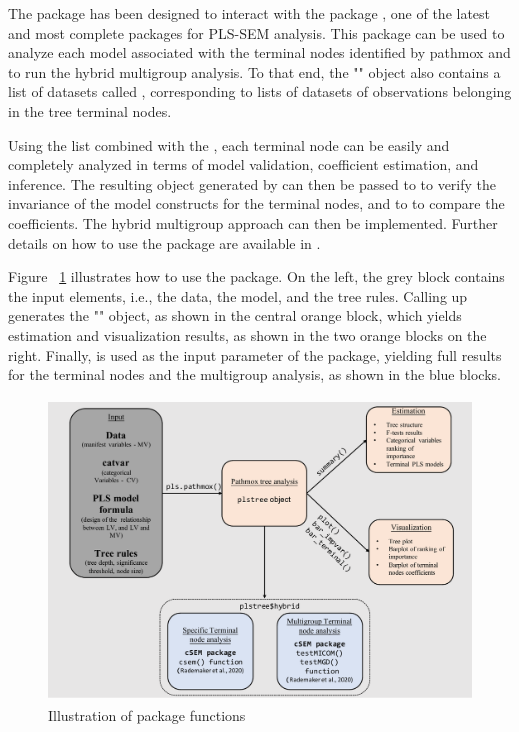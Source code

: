 The  package has been designed to interact with the  package \citep{csem}, one of the latest and  most complete packages for PLS-SEM analysis. This package can be used to analyze each model associated with the terminal nodes identified by pathmox and to run the hybrid multigroup analysis. To that end, the  "" object also contains a list of datasets called , corresponding to lists of datasets of observations belonging in the tree terminal nodes. 

Using the  list combined with the , each terminal node can be easily and completely analyzed  in terms of model validation, coefficient estimation, and inference. The resulting object generated by  can then be passed to   to verify the invariance of the model constructs for the terminal nodes, and to   to compare the coefficients. The hybrid multigroup approach \citep{Lamberti21} can then be implemented. Further details on how to use the  package are available in \citet{csem}. 

Figure ~\ref{figure:flow} illustrates how to use the  package. On the left, the grey block contains the input elements, i.e., the data, the model, and the tree rules. Calling up  generates the  "" object, as shown in the central orange block, which yields estimation and visualization results, as shown in the two orange blocks on the right. Finally,   is used as the input parameter of the  package, yielding full results for the terminal nodes and the multigroup analysis, as shown in the blue  blocks. 

\begin{figure}[htbp]
  \centering
  \includegraphics[height=8cm]{Fig1_flow}
  \caption{Illustration of  package functions}
  \label{figure:flow}
\end{figure}


